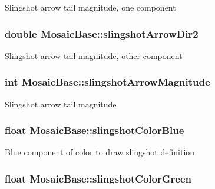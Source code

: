 \label{class_mosaic_base_a9b2306b8335a0b7528a32b6d85759e08}
Slingshot arrow tail magnitude, one component \hypertarget{class_mosaic_base_a9c1669497925f491578950e209315fb0}{
\subsubsection[{slingshotArrowDir2}]{\setlength{\rightskip}{0pt plus 5cm}double {\bf MosaicBase::slingshotArrowDir2}}}
\label{class_mosaic_base_a9c1669497925f491578950e209315fb0}
Slingshot arrow tail magnitude, other component \hypertarget{class_mosaic_base_a25d029dec46301eee1e657d700e3e273}{
\subsubsection[{slingshotArrowMagnitude}]{\setlength{\rightskip}{0pt plus 5cm}int {\bf MosaicBase::slingshotArrowMagnitude}}}
\label{class_mosaic_base_a25d029dec46301eee1e657d700e3e273}
Slingshot arrow tail magnitude \hypertarget{class_mosaic_base_a13c2c5a15d344a293dbefb5d8192f650}{
\subsubsection[{slingshotColorBlue}]{\setlength{\rightskip}{0pt plus 5cm}float {\bf MosaicBase::slingshotColorBlue}}}
\label{class_mosaic_base_a13c2c5a15d344a293dbefb5d8192f650}
Blue component of color to draw slingshot definition \hypertarget{class_mosaic_base_a8b48adbc5cc23b8960ae0cd2974c631e}{
\subsubsection[{slingshotColorGreen}]{\setlength{\rightskip}{0pt plus 5cm}float {\bf MosaicBase::slingshotColorGreen}}}
